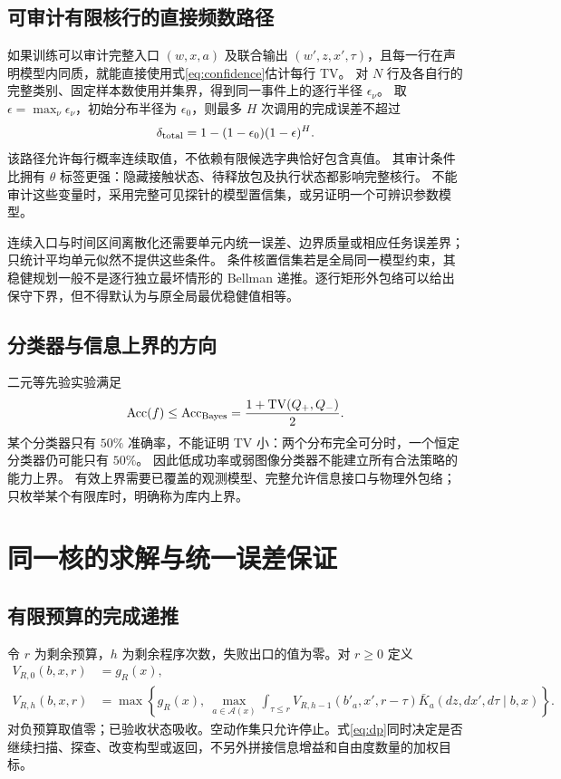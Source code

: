 \documentclass[11pt,a4paper,fontset=fandol]{ctexart}
\theoremstyle{definition}
\theoremstyle{remark}
\numberwithin{equation}{section}
\newcommand{\cA}{\mathcal A}
\newcommand{\TV}{\operatorname{TV}}
\begin{document}
\subsection{可审计有限核行的直接频数路径}
如果训练可以审计完整入口 $(w,x,a)$ 及联合输出 $(w',z,x',\tau)$，且每一行在声明模型内同质，就能直接使用式\eqref{eq:confidence}估计每行 TV。
对 $N$ 行及各自行的完整类别、固定样本数使用并集界，得到同一事件上的逐行半径 $\epsilon_\nu$。
取 $\epsilon=\max_\nu\epsilon_\nu$，初始分布半径为 $\epsilon_0$，则最多 $H$ 次调用的完成误差不超过
\begin{equation}
 \delta_{\rm total}=1-(1-\epsilon_0)(1-\epsilon)^H.
 \label{eq:initial-bound}
\end{equation}
该路径允许每行概率连续取值，不依赖有限候选字典恰好包含真值。
其审计条件比拥有 $\theta$ 标签更强：隐藏接触状态、待释放包及执行状态都影响完整核行。
不能审计这些变量时，采用完整可见探针的模型置信集，或另证明一个可辨识参数模型。

连续入口与时间区间离散化还需要单元内统一误差、边界质量或相应任务误差界；只统计平均单元似然不提供这些条件。
条件核置信集若是全局同一模型约束，其稳健规划一般不是逐行独立最坏情形的 Bellman 递推。逐行矩形外包络可以给出保守下界，但不得默认为与原全局最优稳健值相等。

\subsection{分类器与信息上界的方向}
二元等先验实验满足
\begin{equation}
 \operatorname{Acc}(f)\le\operatorname{Acc}_{\rm Bayes}
 =\frac{1+\TV(Q_+,Q_-)}2.
 \label{eq:classifier-direction}
\end{equation}
某个分类器只有 $50\%$ 准确率，不能证明 TV 小：两个分布完全可分时，一个恒定分类器仍可能只有 $50\%$。
因此低成功率或弱图像分类器不能建立所有合法策略的能力上界。
有效上界需要已覆盖的观测模型、完整允许信息接口与物理外包络；只枚举某个有限库时，明确称为库内上界。
\section{同一核的求解与统一误差保证}
\label{sec:solver}
\subsection{有限预算的完成递推}
令 $r$ 为剩余预算，$h$ 为剩余程序次数，失败出口的值为零。对 $r\ge0$ 定义
\begin{align}
 V_{R,0}(b,x,r)&=g_R(x),\label{eq:base}\\
 V_{R,h}(b,x,r)
 &=\max\left\{g_R(x),\
 \max_{a\in\cA(x)}
 \int_{\tau\le r}
 V_{R,h-1}(b'_a,x',r-\tau)
 \bar K_a(dz,dx',d\tau\mid b,x)
 \right\}.
 \label{eq:dp}
\end{align}
对负预算取值零；已验收状态吸收。空动作集只允许停止。式\eqref{eq:dp}同时决定是否继续扫描、探查、改变构型或返回，不另外拼接信息增益和自由度数量的加权目标。
\end{document}
